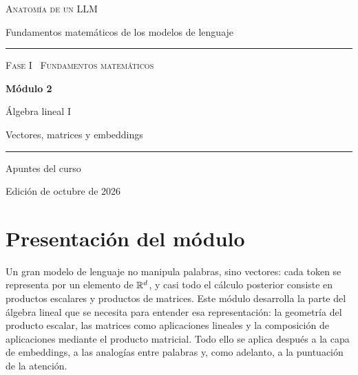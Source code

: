 \documentclass[11pt,a4paper,twoside,openany]{book}
\begin{document}
\frontmatter
\begin{titlepage}
\centering
\vspace*{2.5cm}
{\large\scshape Anatomía de un LLM}\par
\vspace{0.4cm}
{\normalsize Fundamentos matemáticos de los modelos de lenguaje}\par
\vspace{2.2cm}
\rule{\textwidth}{0.8pt}\par\vspace{0.5cm}
{\small\scshape Fase I \textperiodcentered\ Fundamentos matemáticos}\par\vspace{0.3cm}
{\Huge\bfseries Módulo 2\par}\vspace{0.3cm}
{\LARGE Álgebra lineal I\par}
\vspace{0.2cm}
{\large Vectores, matrices y embeddings\par}
\vspace{0.5cm}\rule{\textwidth}{0.4pt}\par
\vspace{1.6cm}
{\large Apuntes del curso}\par
\vfill
{\small Edición de octubre de 2026}\par
\end{titlepage}

\chapter*{Presentación del módulo}

Un gran modelo de lenguaje no manipula palabras, sino vectores: cada token se representa por un elemento de $\mathbb{R}^{d}$, y casi todo el cálculo posterior consiste en productos escalares y productos de matrices. Este módulo desarrolla la parte del álgebra lineal que se necesita para entender esa representación: la geometría del producto escalar, las matrices como aplicaciones lineales y la composición de aplicaciones mediante el producto matricial. Todo ello se aplica después a la capa de embeddings, a las analogías entre palabras y, como adelanto, a la puntuación de la atención.
\end{document}
